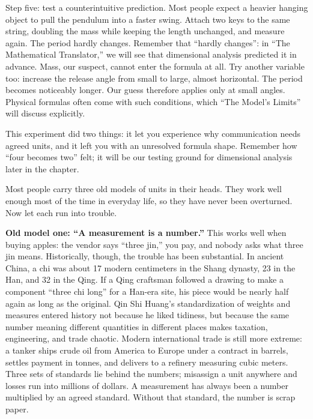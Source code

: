 \begin{experiment}
Step five: test a counterintuitive prediction. Most people expect a heavier hanging object to pull the pendulum into a faster swing. Attach two keys to the same string, doubling the mass while keeping the length unchanged, and measure again. The period hardly changes. Remember that ``hardly changes'': in ``The Mathematical Translator,'' we will see that dimensional analysis predicted it in advance. Mass, our suspect, cannot enter the formula at all. Try another variable too: increase the release angle from small to large, almost horizontal. The period becomes noticeably longer. Our guess therefore applies only at small angles. Physical formulas often come with such conditions, which ``The Model's Limits'' will discuss explicitly.
\end{experiment}

This experiment did two things: it let you experience why communication needs agreed units, and it left you with an unresolved formula shape. Remember how ``four becomes two'' felt; it will be our testing ground for dimensional analysis later in the chapter.


Most people carry three old models of units in their heads. They work well enough most of the time in everyday life, so they have never been overturned. Now let each run into trouble.

\textbf{Old model one: ``A measurement is a number.''} This works well when buying apples: the vendor says ``three jin,'' you pay, and nobody asks what three jin means. Historically, though, the trouble has been substantial. In ancient China, a chi was about 17 modern centimeters in the Shang dynasty, 23 in the Han, and 32 in the Qing. If a Qing craftsman followed a drawing to make a component ``three chi long'' for a Han-era site, his piece would be nearly half again as long as the original. Qin Shi Huang's standardization of weights and measures entered history not because he liked tidiness, but because the same number meaning different quantities in different places makes taxation, engineering, and trade chaotic. Modern international trade is still more extreme: a tanker ships crude oil from America to Europe under a contract in barrels, settles payment in tonnes, and delivers to a refinery measuring cubic meters. Three sets of standards lie behind the numbers; misassign a unit anywhere and losses run into millions of dollars. A measurement has always been a number multiplied by an agreed standard. Without that standard, the number is scrap paper.

